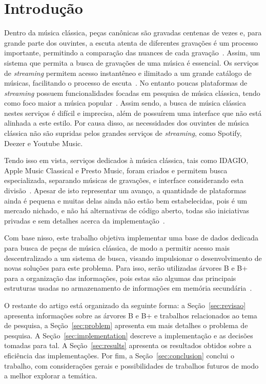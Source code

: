 \documentclass[12pt]{article}
\begin{document}
\section{Introdução}
Dentro da música clássica, peças canônicas são gravadas centenas de vezes e,
para grande parte dos ouvintes, a escuta atenta de diferentes gravações é um
processo importante, permitindo a comparação das nuances de cada gravação~\cite{Bl:25}.
Assim, um sistema que permita a busca de gravações de uma música é essencial.
Os serviços de \emph{streaming} permitem acesso instantêneo e ilimitado a um
grande catálogo de músicas, facilitando o processo de escuta~\cite{MoVi:18}.
No entanto poucas plataformas de \emph{streaming} possuem funcionalidades focadas em
pesquisa de música clássica, tendo como foco maior a música popular~\cite{Bl:25}.
Assim sendo, a busca de música clássica nestes serviços é difícil e imprecisa, 
além de possuírem uma interface que não está alinhada a este estilo.
Por causa disso, as necessidades dos ouvintes de música clássica não são supridas
pelos grandes serviços de \emph{streaming}, como Spotify, Deezer e Youtube Music.

Tendo isso em vista, serviços dedicados à música clássica, tais como
IDAGIO, Apple Music Classical e Presto Music, foram criados e permitem busca
especializada, separando músicas de gravações, e interface considerando esta
divisão~\cite{Bl:25}.
Apesar de isto representar um avanço, a quantidade de plataformas ainda é pequena
e muitas delas ainda não estão bem estabelecidas, pois é um mercado nichado, e 
não há alternativas de código aberto, todas são iniciativas privadas e sem
detalhes acerca da implementação~\cite{Bl:25}.

Com base nisso, este trabalho objetiva implementar uma base de dados dedicada
para busca de peças de música clássica, de modo a permitir acesso mais
descentralizado a um sistema de busca, visando impulsionar o desenvolvimento de
novas soluções para este problema.
Para isso, serão utilizadas árvores B e B+ para a organização das informações,
pois estas são algumas das principais estruturas usadas no armazenamento de
informações em memória secundária~\cite{Co:79}.

O restante do artigo está organizado da seguinte forma:
a Seção~\ref{sec:revisao} apresenta informações sobre as árvores B e B+ e
trabalhos relacionados ao tema de pesquisa, a Seção~\ref{sec:problem} apresenta
em mais detalhes o problema de pesquisa. A Seção~\ref{sec:implementation}
descreve a implementação e as decisões tomadas para tal. A Seção~\ref{sec:results}
apresenta os resultados obtidos sobre a eficiência das implementações.
Por fim, a Seção~\ref{sec:conclusion} conclui o trabalho, com considerações
gerais e possibilidades de trabalhos futuros de modo a melhor explorar a temática.
\end{document}

